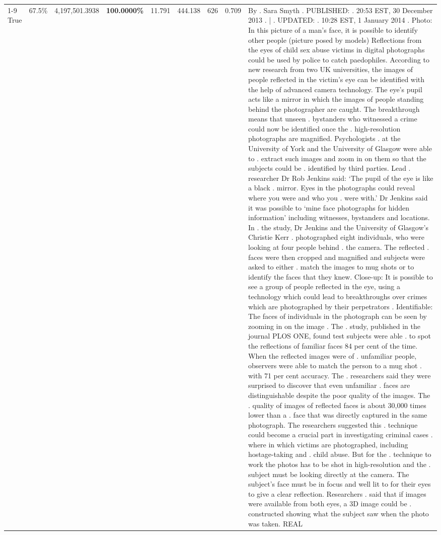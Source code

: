 \begin{table}[H]
\begin{tabular}{lllrlllll}
\cline{1-9}
True & 67.5\% & 4,197,501.3938 & \bfseries \color{red} 100.0000\% & 11.791 & 444.138 & 626 & 0.709 & By . Sara Smyth . PUBLISHED: . 20:53 EST, 30 December 2013 . | . UPDATED: . 10:28 EST, 1 January 2014 . Photo: In this picture of a man's face, it is possible to identify other people (picture posed by models) Reflections from the eyes of child sex abuse victims in digital photographs could be used by police to catch paedophiles. According to new research from two UK universities, the images of people reflected in the victim's eye can be identified with the help of advanced camera technology. The eye's pupil acts like a mirror in which the images of people standing behind the photographer are caught. The breakthrough means that unseen . bystanders who witnessed a crime could now be identified once the . high-resolution photographs are magnified. Psychologists . at the University of York and the University of Glasgow were able to . extract such images and zoom in on them so that the subjects could be . identified by third parties. Lead . researcher Dr Rob Jenkins said: ‘The pupil of the eye is like a black . mirror. Eyes in the photographs could reveal where you were and who you . were with.' Dr Jenkins said it was possible to ‘mine face photographs for hidden information' including witnesses, bystanders and locations. In . the study, Dr Jenkins and the University of Glasgow's Christie Kerr . photographed eight individuals, who were looking at four people behind . the camera. The reflected . faces were then cropped and magnified and subjects were asked to either . match the images to mug shots or to identify the faces that they knew. Close-up: It is possible to see a group of people reflected in the eye, using a technology which could lead to breakthroughs over crimes which are photographed by their perpetrators . Identifiable: The faces of individuals in the photograph can be seen by zooming in on the image . The . study, published in the journal PLOS ONE, found test subjects were able . to spot the reflections of familiar faces 84 per cent of the time. When the reflected images were of . unfamiliar people, observers were able to match the person to a mug shot . with 71 per cent accuracy. The . researchers said they were surprised to discover that even unfamiliar . faces are distinguishable despite the poor quality of the images. The . quality of images of reflected faces is about 30,000 times lower than a . face that was directly captured in the same photograph. The researchers suggested this . technique could become a crucial part in investigating criminal cases . where in which victims are photographed, including hostage-taking and . child abuse. But for the . technique to work the photos has to be shot in high-resolution and the . subject must be looking directly at the camera. The subject's face must be in focus and well lit to for their eyes to give a clear reflection. Researchers . said that if images were available from both eyes, a 3D image could be . constructed showing what the subject saw when the photo was taken. REAL \\

\end{tabular}
\end{table}
